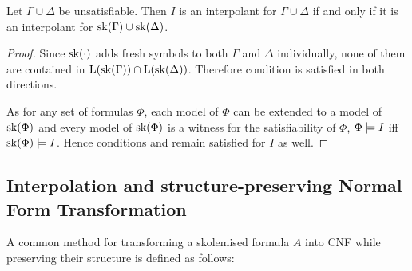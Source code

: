 \begin{prop}
	Let $\Gamma \cup \Delta$ be unsatisfiable.
	Then $I$ is an interpolant for $\Gamma \cup \Delta$ if and only if it is an interpolant for $\operatorname{sk}(\Gamma) \cup \operatorname{sk}(\Delta)$. 
\end{prop}

\begin{proof}
	Since $\operatorname{sk}(\cdot)$ adds fresh symbols to both $\Gamma$ and $\Delta$ individually,
	none of them are contained in $\operatorname{L}(\operatorname{sk}(\Gamma)) \cap \operatorname{L}(\operatorname{sk}(\Delta))$.
	Therefore condition  is satisfied in both directions.

	As for any set of formulas $\Phi$, each model of $\Phi$ can be extended to a model of $\operatorname{sk}(\Phi)$ and every model of $\operatorname{sk}(\Phi)$ is a witness for the satisfiability of $\Phi$, $\Phi \models I$ iff $\operatorname{sk}(\Phi) \models I$.
	Hence conditions  and  remain satisfied for $I$ as well.
\end{proof}


\subsection{Interpolation and structure-preserving Normal Form Transformation}

A common method for transforming a skolemised formula $A$ into CNF while preserving their structure is defined as follows:

